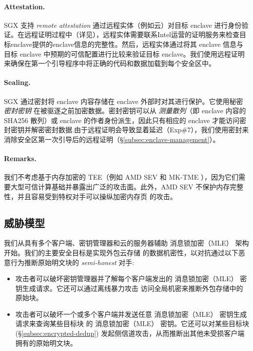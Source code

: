 \paragraph{Attestation.} SGX 支持 \textit{ remote attestation} 通过远程实体（例如云）对目标 enclave 进行身份验证。在远程证明过程中（详见\cite{sgx}），远程实体需要联系Intel运营的证明服务来检查目标enclave提供的enclave信息的完整性。然后，远程实体通过将其 enclave 信息与目标 enclave 中预期的可信配置进行比较来验证目标 enclave。我们使用远程证明来确保在第一个引导程序中将正确的代码和数据加载到每个安全区中。

\paragraph{Sealing.} SGX 通过密封将 enclave 内容存储在 enclave 外部时对其进行保护。它使用秘密 \textit{ 密封密钥} 在被驱逐之前加密数据。密封密钥可以从 \textit{ 测量散列}（即 enclave 内容的 SHA256 散列）或 enclave 的作者身份派生，因此只有相应的 enclave 才能访问密封密钥并解密密封数据.由于远程证明会导致显着延迟（Exp\#7），我们使用密封来消除安全区第一次引导后的远程证明（\S\ref{subsec:enclave-management}）。

\paragraph{Remarks.} 我们不考虑基于内存加密的 TEE（例如 AMD SEV \cite{Amdsev} 和 MK-TME \cite{Mktem}），因为它们需要大型可信计算基础并暴露出广泛的攻击面\cite{mofrad18}。此外，AMD SEV \cite{Amdsev} 不保护内存完整性，并且容易受到特权对手可以操纵加密内存页 \cite{mofrad18} 的攻击。

\subsection{威胁模型}
\label{subsec:threat}

 我们从具有多个客户端、密钥管理器和云的服务器辅助 消息锁加密（MLE） 架构 \cite{bellare13b} 开始。我们的主要安全目标是实现外包云存储 \cite{bellare13b} 的数据机密性，以对抗通过以下恶意行为推断原始明文块的 \textit{ semi-honest} 对手:

\begin{itemize}[leftmargin=*]
\item 攻击者可以破坏密钥管理器并了解每个客户端发出的 消息锁加密（MLE） 密钥生成请求。它还可以通过离线暴力攻击 \cite{bellare13b} 访问全局机密来推断外包存储中的原始块。
    \item 攻击者可以破坏一个或多个客户端并发送任意 消息锁加密（MLE） 密钥生成请求来查询某些目标块 \cite{bellare13b} 的 消息锁加密（MLE） 密钥。它还可以对某些目标块 \cite{harnik10} (\S\ref{subsec:encrypted-dedup}) 发起侧信道攻击，从而推断出其他未受损客户端拥有的原始明文块。
\end{itemize}

